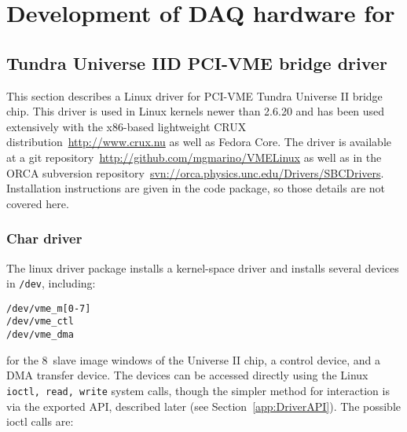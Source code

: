 
\chapter{Development of DAQ hardware for \MJ}
\label{app:ORCASoftwareChapter}

	\section{Tundra Universe IID PCI-VME bridge driver}
	\label{sec:TundraUniverse}

This section describes a Linux driver for PCI-VME Tundra Universe II bridge chip.  This
driver is used in Linux kernels newer than 2.6.20 and has been used extensively with the 
x86-based lightweight CRUX distribution~\url{http://www.crux.nu} as well as Fedora Core.  The driver is available
at a git repository~\url{http://github.com/mgmarino/VMELinux} as well as in the ORCA subversion
repository~\url{svn://orca.physics.unc.edu/Drivers/SBCDrivers}.  Installation instructions
are given in the code package, so those details are not covered here.

		\subsection{Char driver}

The linux driver package installs a kernel-space driver and installs several devices in 
\lstinline!/dev!, including:
		\begin{lstlisting}
/dev/vme_m[0-7]
/dev/vme_ctl
/dev/vme_dma
		\end{lstlisting}
for the 8~slave image windows of the Universe II chip, a control device, and a DMA transfer device.  The devices can be accessed directly using the Linux \lstinline!ioctl, read, write! 
system calls, though the simpler method for interaction is via the exported API, described later (see Section~\ref{app:DriverAPI}).  The possible ioctl calls are:


